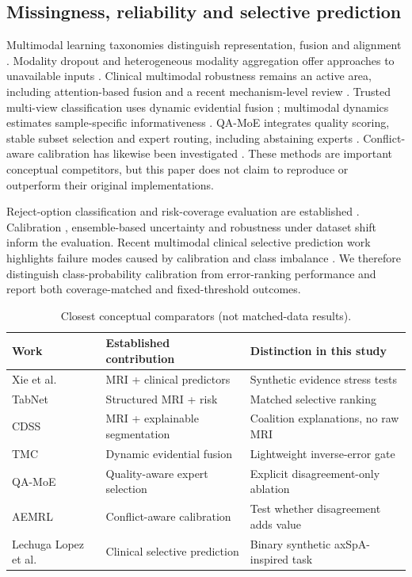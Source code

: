 \documentclass[conference]{IEEEtran}
\begin{document}
\subsection{Missingness, reliability and selective prediction}
Multimodal learning taxonomies distinguish representation, fusion and alignment \cite{bal}. Modality dropout and heterogeneous modality aggregation offer approaches to unavailable inputs \cite{moddrop,hemis}. Clinical multimodal robustness remains an active area, including attention-based fusion \cite{attention} and a recent mechanism-level review \cite{missingreview}. Trusted multi-view classification uses dynamic evidential fusion \cite{tmc}; multimodal dynamics estimates sample-specific informativeness \cite{dynamics}. QA-MoE integrates quality scoring, stable subset selection and expert routing, including abstaining experts \cite{qamoe}. Conflict-aware calibration has likewise been investigated \cite{aemrl}. These methods are important conceptual competitors, but this paper does not claim to reproduce or outperform their original implementations.

Reject-option classification and risk-coverage evaluation are established \cite{selective}. Calibration \cite{guo}, ensemble-based uncertainty \cite{ensembles} and robustness under dataset shift \cite{ovadia} inform the evaluation. Recent multimodal clinical selective prediction work highlights failure modes caused by calibration and class imbalance \cite{lopez}. We therefore distinguish class-probability calibration from error-ranking performance and report both coverage-matched and fixed-threshold outcomes.
\begin{table}[t]
\caption{Closest conceptual comparators (not matched-data results).}
\label{tab:related}
\centering\footnotesize
\renewcommand{\arraystretch}{1.2}
\begin{tabular}{@{}p{}p{}p{}@{}}\toprule
Work & Established contribution & Distinction in this study\\\midrule
Xie et al. \cite{xie} & MRI + clinical predictors & Synthetic evidence stress tests\\
TabNet \cite{tabnet} & Structured MRI + risk & Matched selective ranking\\
CDSS \cite{cdss} & MRI + explainable segmentation & Coalition explanations, no raw MRI\\
TMC \cite{tmc} & Dynamic evidential fusion & Lightweight inverse-error gate\\
QA-MoE \cite{qamoe} & Quality-aware expert selection & Explicit disagreement-only ablation\\
AEMRL \cite{aemrl} & Conflict-aware calibration & Test whether disagreement adds value\\
Lechuga Lopez et al. \cite{lopez} & Clinical selective prediction & Binary synthetic axSpA-inspired task\\\bottomrule
\end{tabular}
\end{table}
\end{document}
